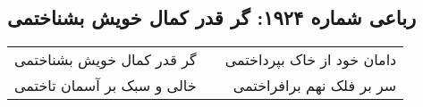 \begin{center}
\section*{رباعی شماره ۱۹۲۴: گر قدر کمال خویش بشناختمی}
\label{sec:1924}
\begin{longtable}{l p{0.5cm} r}
گر قدر کمال خویش بشناختمی
&&
دامان خود از خاک بپرداختمی
\\
خالی و سبک بر آسمان تاختمی
&&
سر بر فلک نهم برافراختمی
\\
\end{longtable}
\end{center}
